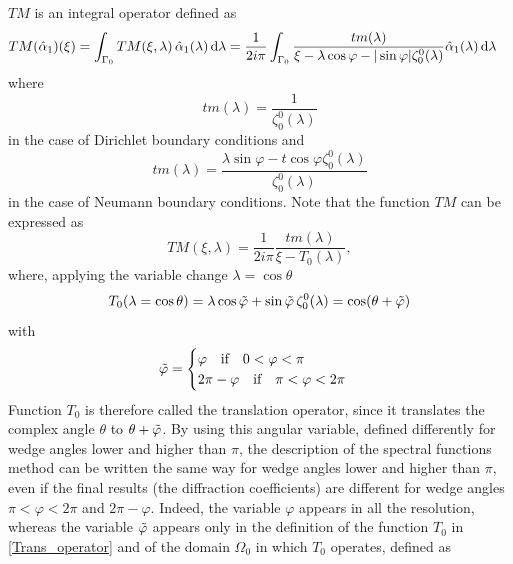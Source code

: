 $TM$ is an integral operator defined as
\begin{equation}
\label{TM_operator}
\begin{split}
TM(\hat{\alpha}_1)(\xi) &= \int_{\Gamma_0} TM(\xi,\lambda) \, \hat{\alpha}_1(\lambda) \, {\rm d} \lambda =\dfrac{1}{2i\pi} \int_{\Gamma_0} \dfrac{ tm(\lambda)}{ \xi- \lambda \cos \varphi  - |\sin \varphi| \zeta_0^0(\lambda)} \hat{\alpha}_1(\lambda) \, {\rm d} \lambda 
\end{split}
\end{equation}
where 
\begin{equation}
\label{tmDir}
tm(\lambda)=\dfrac{1}{\zeta_0^0(\lambda)}
\end{equation}
in the case of Dirichlet boundary conditions and 
\begin{equation}
\label{tmNeu}
tm(\lambda)=\dfrac{\lambda\sin\varphi-t\cos\varphi\zeta_0^0(\lambda)}{\zeta_0^0(\lambda)}
\end{equation}
in the case of Neumann boundary conditions.
Note that the function $TM$ can be expressed as
\begin{equation}
TM(\xi,\lambda) =  \dfrac{1}{2i\pi} \dfrac{ tm(\lambda)}{ \xi- T_0(\lambda)} , 
\end{equation}
where, applying the variable change $\lambda=\cos\theta$
\begin{equation}
\label{Trans_operator}
T_0(\lambda=\cos\theta) =  \lambda \cos \tilde{\varphi}  + \sin \tilde{\varphi} \, \zeta_0^0(\lambda) =  \cos (\theta + \tilde{\varphi})
\end{equation}
with 
\begin{equation}
\tilde{\varphi} =
\begin{cases}
 \varphi \quad \text{if} \quad 0 < \varphi < \pi \qquad \\
 2\pi - \varphi \quad \text{if} \quad \pi < \varphi < 2\pi
 \label{phitilde}
\end{cases}
\end{equation}
Function $T_0$ is therefore called the translation operator, since it translates the complex angle $\theta$ to $\theta+\tilde{\varphi}$. By using this angular variable, defined differently for wedge angles lower and higher than $\pi$, the description of the spectral functions method can be written the same way for wedge angles lower and higher than $\pi$, even if the final results (the diffraction coefficients) are different for wedge angles $\pi<\varphi<2\pi$ and $2\pi-\varphi$. Indeed, the variable $\varphi$ appears in all the resolution, whereas the variable $\tilde{\varphi}$ appears only in the definition of the function $T_0$ in \eqref{Trans_operator} and of the domain $\Omega_0$ in which $T_0$ operates, defined as
